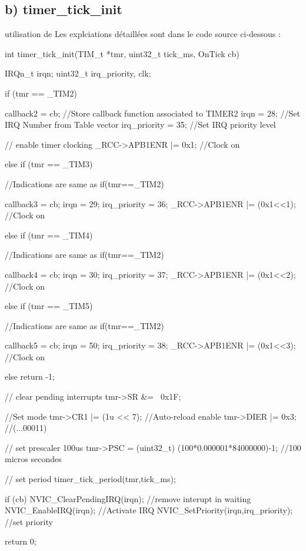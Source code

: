 \subsection{b) timer\_tick\_init}


\begin{Cpp}{utilisation de } 
Les explciations détaillées sont dans le code source ci-dessous : 

int timer_tick_init(TIM_t *tmr, uint32_t tick_ms, OnTick cb)
{
	IRQn_t	 irqn;
	uint32_t irq_priority, clk;

	if (tmr == _TIM2) {
	
    callback2 = cb;     //Store callback function associated to TIMER2
		irqn = 28;          //Set IRQ Number from Table vector
		irq_priority = 35;  //Set IRQ priority level

		// enable timer clocking
    _RCC->APB1ENR |= 0x1; //Clock on
        
	} else if (tmr == _TIM3) {
	
	    //Indications are same as if(tmr==_TIM2)
	
		callback3 = cb;
		irqn = 29;
		irq_priority = 36;
		_RCC->APB1ENR |= (0x1<<1); //Clock on
		
	
	} else if (tmr == _TIM4) {
	
	    //Indications are same as if(tmr==_TIM2)
	    
		callback4 = cb;
		irqn = 30;
		irq_priority = 37;
		_RCC->APB1ENR |= (0x1<<2); //Clock on
	
	} else if (tmr == _TIM5) {
		
		//Indications are same as if(tmr==_TIM2)
		
		callback5 = cb;
		irqn = 50;
		irq_priority = 38;
		_RCC->APB1ENR |= (0x1<<3); //Clock on
	
	} else {
		return -1;
	}
	
	// clear pending interrupts
	tmr->SR &= ~0x1F;
	
	//Set mode
	tmr->CR1 |= (1u << 7);          //Auto-reload enable
	tmr->DIER |= 0x3;               //(...00011)
	
	// set prescaler 100us
	tmr->PSC = (uint32_t) (100*0.000001*84000000)-1; //100 micros secondes
	
	// set period
	timer_tick_period(tmr,tick_ms);
	
	if (cb) {
		NVIC_ClearPendingIRQ(irqn);  //remove interupt in waiting 
		NVIC_EnableIRQ(irqn);  			//Activate IRQ
		NVIC_SetPriority(irqn,irq_priority);  //set priority
	}
	
    return 0;
}

\end{Cpp}

